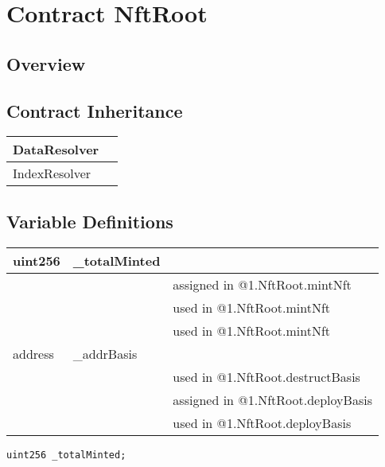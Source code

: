 
\chapter{Contract NftRoot}

\minitoc

\section{Overview}



\section{Contract Inheritance}


\noindent\begin{tabular}{|l|p{5cm}|}\hline
DataResolver & \\\hline
IndexResolver & \\\hline
\end{tabular}


\section{Variable Definitions}


\ifsoltables
\noindent\begin{tabular}{|l|l|p{5cm}|}\hline
uint256 & \_{}totalMinted &  \\\hline
 & & assigned in @1.NftRoot.mintNft\\\hline
 & & used in @1.NftRoot.mintNft\\\hline
 & & used in @1.NftRoot.mintNft\\\hline
address & \_{}addrBasis &  \\\hline
 & & used in @1.NftRoot.destructBasis\\\hline
 & & assigned in @1.NftRoot.deployBasis\\\hline
 & & used in @1.NftRoot.deployBasis\\\hline
\end{tabular}
\fi

\begin{lstlisting}[firstnumber=16]
    uint256 _totalMinted;
\end{lstlisting}

